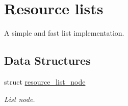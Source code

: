\hypertarget{group__rlists}{\section{Resource lists}
\label{group__rlists}
}


A simple and fast list implementation.  


\subsection*{Data Structures}
\begin{DoxyCompactItemize}
\item 
struct \hyperlink{structresource__list__node}{resource\-\_\-list\-\_\-node}
\begin{DoxyCompactList}\small\item\em List node. \end{DoxyCompactList}\end{DoxyCompactItemize}
